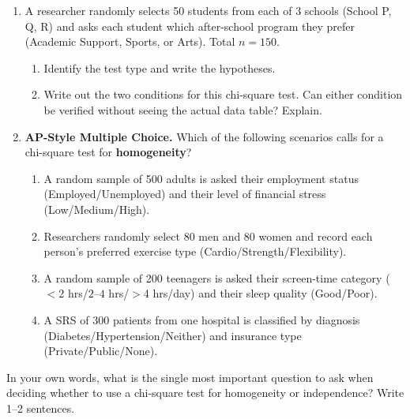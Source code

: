 \documentclass[10pt]{article}
\begin{document}
\begin{enumerate}

  \item A researcher randomly selects 50 students from each of 3 schools
        (School P, Q, R) and asks each student which after-school program they prefer
        (Academic Support, Sports, or Arts). Total $n = 150$.

        \begin{enumerate}[label=(\alph*)]
          \item Identify the test type and write the hypotheses.


          \item Write out the two conditions for this chi-square test.
                Can either condition be verified without seeing the actual data table?
                Explain.

        \end{enumerate}

  \item \textbf{AP-Style Multiple Choice.} Which of the following scenarios calls for
        a chi-square test for \textbf{homogeneity}?

        \begin{enumerate}[label=(\Alph*)]
          \item A random sample of 500 adults is asked their employment status
                (Employed/Unemployed) and their level of financial stress (Low/Medium/High).
          \item Researchers randomly select 80 men and 80 women and record each person's
                preferred exercise type (Cardio/Strength/Flexibility).
          \item A random sample of 200 teenagers is asked their screen-time category
                ($<$2 hrs/$2$--$4$ hrs/$>$4 hrs/day) and their sleep quality (Good/Poor).
          \item A SRS of 300 patients from one hospital is classified by diagnosis
                (Diabetes/Hypertension/Neither) and insurance type (Private/Public/None).
        \end{enumerate}

\end{enumerate}

\begin{reflectionbox}
In your own words, what is the single most important question to ask when deciding whether
to use a chi-square test for homogeneity or independence? Write 1--2 sentences.
\end{reflectionbox}
\end{document}
